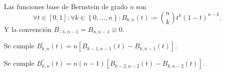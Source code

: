 \begin{frame}
    \begin{definition}
        Las funciones base de Bernstein de grado $n$ son
        \begin{equation*}
            \forall t\in\left[0,1\right]:
            \forall k\in\left\{0,\dotsc,n\right\}:
            B_{k,n}\left(t\right)\coloneqq
            \binom{n}{k}
            t^{k}
            \left(1-t\right)^{n-k}.
        \end{equation*}
        Y la convención
        \begin{math}
            B_{-1,n-1}=
            B_{n,n-1}\equiv0
        \end{math}.
    \end{definition}

    \begin{theorem}
        Se cumple
        \begin{math}
            B^{\prime}_{k,n}\left(t\right)=
            n
            \left[
                B_{k-1,n-1}\left(t\right)-
                B_{k,n-1}\left(t\right)
                \right]
        \end{math}.
    \end{theorem}

    \begin{corollary}
        Se cumple
        \begin{math}
            B^{\prime\prime}_{k,n}\left(t\right)=
            n\left(n-1\right)
            \left[
                B_{k-2,n-2}\left(t\right)-
                B_{k,n-2}\left(t\right)
                \right]
        \end{math}.
    \end{corollary}


\end{frame}
